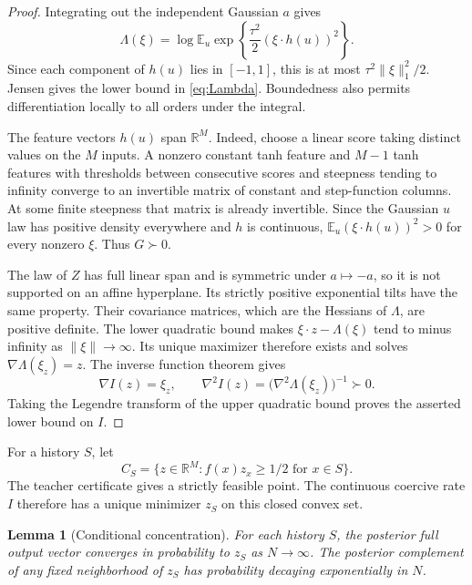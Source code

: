 \documentclass[11pt]{article}
\newtheorem{lemma}[theorem]{Lemma}
\newcommand{\R}{\mathbb R}
\newcommand{\E}{\mathbb E}
\begin{document}
\begin{proof}
Integrating out the independent Gaussian $a$ gives
\[
 \Lambda(\xi)=\log\E_u\exp\left\{
       \frac{\tau^2}{2}(\xi\cdot h(u))^2\right\}.
\]
Since each component of $h(u)$ lies in $[-1,1]$, this is at most
$\tau^2\|\xi\|_1^2/2$. Jensen gives the lower bound in
\eqref{eq:Lambda}. Boundedness also permits differentiation locally to
all orders under the integral.

The feature vectors $h(u)$ span $\R^M$. Indeed, choose a linear score
taking distinct values on the $M$ inputs. A nonzero constant tanh feature
and $M-1$ tanh features with thresholds between consecutive scores and
steepness tending to infinity converge to an invertible matrix of
constant and step-function columns. At some finite steepness that matrix
is already invertible. Since the Gaussian $u$ law has positive density
everywhere and $h$ is continuous, $\E_u(\xi\cdot h(u))^2>0$ for every
nonzero $\xi$. Thus $G\succ0$.

The law of $Z$ has full linear span and is symmetric under $a\mapsto-a$,
so it is not supported on an affine hyperplane. Its strictly positive
exponential tilts have the same property. Their covariance matrices,
which are the Hessians of $\Lambda$, are positive definite. The lower
quadratic bound makes $\xi\cdot z-\Lambda(\xi)$ tend to minus infinity
as $\|\xi\|\to\infty$. Its unique maximizer therefore exists and solves
$\nabla\Lambda(\xi_z)=z$. The inverse function theorem gives
\[
 \nabla I(z)=\xi_z,\qquad
 \nabla^2I(z)=\big(\nabla^2\Lambda(\xi_z)\big)^{-1}\succ0.
\]
Taking the Legendre transform of the upper quadratic bound proves the
asserted lower bound on $I$.
\end{proof}

For a history $S$, let
\begin{equation}\label{eq:CS}
 C_S=\{z\in\R^M:f(x)z_x\ge1/2\text{ for }x\in S\}.
\end{equation}
The teacher certificate gives a strictly feasible point. The continuous
coercive rate $I$ therefore has a unique minimizer $z_S$ on this closed
convex set.

\begin{lemma}[Conditional concentration]\label{lem:conditioning}
For each history $S$, the posterior full output vector converges in
probability to $z_S$ as $N\to\infty$. The posterior complement of any
fixed neighborhood of $z_S$ has probability decaying exponentially in $N$.
\end{lemma}
\end{document}
